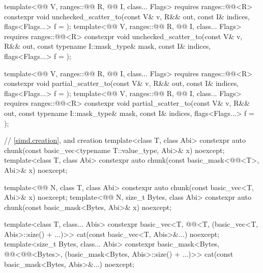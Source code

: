 \begin{codeblock}
{  template<@@ V, ranges::@@ R, @@ I, class... Flags>
    requires ranges::@@<R>
    constexpr void
      unchecked_scatter_to(const V& v, R&& out,
                           const I& indices, flags<Flags...> f = {});
  template<@@ V, ranges::@@ R, @@ I, class... Flags>
    requires ranges::@@<R>
    constexpr void
      unchecked_scatter_to(const V& v, R&& out, const typename I::mask_type& mask,
                           const I& indices, flags<Flags...> f = {});

  template<@@ V, ranges::@@ R, @@ I, class... Flags>
    requires ranges::@@<R>
    constexpr void
      partial_scatter_to(const V& v, R&& out,
                         const I& indices, flags<Flags...> f = {});
  template<@@ V, ranges::@@ R, @@ I, class... Flags>
    requires ranges::@@<R>
    constexpr void
      partial_scatter_to(const V& v, R&& out, const typename I::mask_type& mask,
                         const I& indices, flags<Flags...> f = {});

  // \ref{simd.creation},  and  creation
  template<class T, class Abi>
    constexpr auto chunk(const basic_vec<typename T::value_type, Abi>& x) noexcept;
  template<class T, class Abi>
    constexpr auto chunk(const basic_mask<@@<T>, Abi>& x) noexcept;

  template<@@ N, class T, class Abi>
    constexpr auto chunk(const basic_vec<T, Abi>& x) noexcept;
  template<@@ N, size_t Bytes, class Abi>
    constexpr auto chunk(const basic_mask<Bytes, Abi>& x) noexcept;

  template<class T, class... Abis>
    constexpr basic_vec<T, @@<T, (basic_vec<T, Abis>::size() + ...)>>
      cat(const basic_vec<T, Abis>&...) noexcept;
  template<size_t Bytes, class... Abis>
    constexpr basic_mask<Bytes, @@<@@<Bytes>,
                              (basic_mask<Bytes, Abis>::size() + ...)>>
      cat(const basic_mask<Bytes, Abis>&...) noexcept;

}
\end{codeblock}
